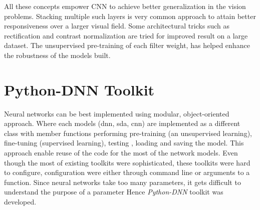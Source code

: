 \par All these concepts empower CNN to achieve better generalization in the vision problems.  Stacking multiple such layers is very common approach to attain better responsiveness over a larger visual field.  Some architectural tricks such as rectification and contrast normalization are tried for improved result on a large dataset.  The unsupervised pre-training of each filter weight, has helped enhance the robustness of the models built.

\section{Python-DNN Toolkit}
\label{sec:pyDNN}
Neural networks can be best implemented using modular, object-oriented approach.  Where each models (dnn, sda, cnn) are implemented as a different class with member functions performing pre-training (an unsupervised learning), fine-tuning (supervised learning), testing , loading and saving the model.  This approach enable reuse of the code for the most of the network models.  Even though the most of existing toolkits were sophisticated, these toolkits were hard to configure, configuration were either through command line or arguments to a function.  Since neural networks take too many parameters, it gets difficult to understand the purpose of a parameter Hence  \textit{Python-DNN} toolkit was developed.  
